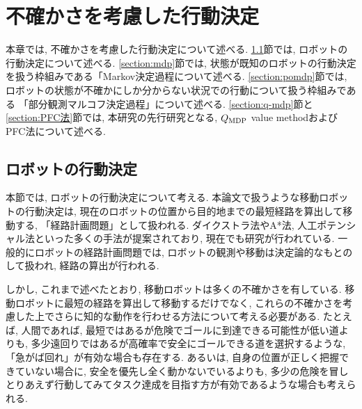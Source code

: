 \chapter{不確かさを考慮した行動決定} \label{chapter:pomdp}

本章では, 不確かさを考慮した行動決定について述べる. 
\ref{section:ロボットの行動決定}節では, ロボットの行動決定について述べる. 
\ref{section:mdp}節では, 状態が既知のロボットの行動決定を扱う枠組みである「Markov決定過程について述べる. 
\ref{section:pomdp}節では, ロボットの状態が不確かにしか分からない状況での行動について扱う枠組みである
「部分観測マルコフ決定過程」について述べる. 
\ref{section:q-mdp}節と\ref{section:PFC法}節では, 
本研究の先行研究となる, $Q_{\rm MDP}$ value methodおよびPFC法について述べる. 



\section{ロボットの行動決定} \label{section:ロボットの行動決定}
本節では, ロボットの行動決定について考える. 
本論文で扱うような移動ロボットの行動決定は, 現在のロボットの位置から目的地までの最短経路を算出して移動する, 「経路計画問題」として扱われる. 
ダイクストラ法やA*法, 人工ポテンシャル法といった多くの手法が提案されており, 現在でも研究が行われている. 
一般的にロボットの経路計画問題では, ロボットの観測や移動は決定論的なもとのして扱われ, 経路の算出が行われる. 

しかし, これまで述べたとおり, 移動ロボットは多くの不確かさを有している. 
移動ロボットに最短の経路を算出して移動するだけでなく, これらの不確かさを考慮した上でさらに知的な動作を行わせる方法について考える必要がある. 
たとえば, 人間であれば, 最短ではあるが危険でゴールに到達できる可能性が低い道よりも, 多少遠回りではあるが高確率で安全にゴールできる道を選択するような, 
「急がば回れ」が有効な場合も存在する. 
あるいは, 自身の位置が正しく把握できていない場合に, 安全を優先し全く動かないでいるよりも, 
多少の危険を冒しとりあえず行動してみてタスク達成を目指す方が有効であるような場合も考えられる. 


